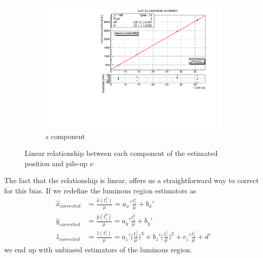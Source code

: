 \begin{figure}
\begin{subfigure}{0.31\textwidth}
    \includegraphics[width=\linewidth]{figures/z_to_lumi_fit_20000_numpix.pdf}
    \caption{$z$ component}
    \label{fig:z_to_lumi}
    \end{subfigure}
    \caption{Linear relationship between each component of the estimated position and pile-up $\nu$}
\end{figure}
The fact that the relationship is linear, offers us a straightforward way to correct for this bias. If we redefine the luminous region estimators as
\begin{equation}
\begin{split}
    \hat{x}_{corrected} &=\frac{\hat{x}(t^x_1)}{\mu}= a_x ' \frac{t^x_1}{\mu} + b_x '\\%
    \hat{y}_{corrected} &=\frac{\hat{y}(t^y_1)}{\mu}= a_y ' \frac{t^y_1}{\mu} + b_y ' \\%
    \hat{z}_{corrected} &=\frac{\hat{z}(t^z_1)}{\mu}=  a_z '\biggl(\frac{t^z_1}{\mu}\biggr)^3 + b_z '\biggl(\frac{t^z_1}{\mu}\biggr)^2 + c_z ' \frac{t^z_1}{\mu} + d ' \label{x_hat_corrected}
    \end{split}
    \end{equation}
we end up with unbiased estimators of the luminous region.



